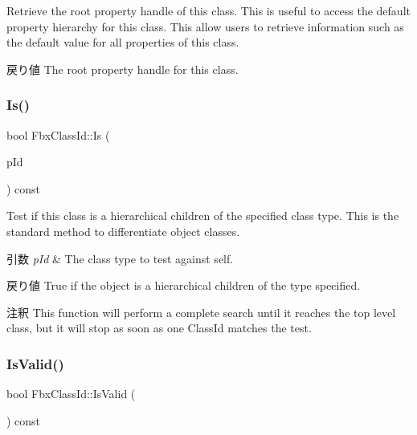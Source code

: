 Retrieve the root property handle of this class. This is useful to access the default property hierarchy for this class. This allow users to retrieve information such as the default value for all properties of this class. \begin{DoxyReturn}{戻り値}
The root property handle for this class. 
\end{DoxyReturn}
\mbox{\label{class_fbx_class_id_a276315faecc3a540664b49f6ba73b542}} 
\subsubsection{\texorpdfstring{Is()}{Is()}}
{\footnotesize\ttfamily bool Fbx\+Class\+Id\+::\+Is (\begin{DoxyParamCaption}\item[{const \hyperlink{class_fbx_class_id}{Fbx\+Class\+Id} \&}]{p\+Id }\end{DoxyParamCaption}) const}

Test if this class is a hierarchical children of the specified class type. This is the standard method to differentiate object classes. 
\begin{DoxyParams}{引数}
{\em p\+Id} & The class type to test against self. \\
\hline
\end{DoxyParams}
\begin{DoxyReturn}{戻り値}
True if the object is a hierarchical children of the type specified. 
\end{DoxyReturn}
\begin{DoxyRemark}{注釈}
This function will perform a complete search until it reaches the top level class, but it will stop as soon as one Class\+Id matches the test. 
\end{DoxyRemark}
\mbox{\label{class_fbx_class_id_a7ef887641b41040beea323813806046c}} 
\subsubsection{\texorpdfstring{Is\+Valid()}{IsValid()}}
{\footnotesize\ttfamily bool Fbx\+Class\+Id\+::\+Is\+Valid (\begin{DoxyParamCaption}{ }\end{DoxyParamCaption}) const\hspace{0.3cm}{\ttfamily [inline]}}

